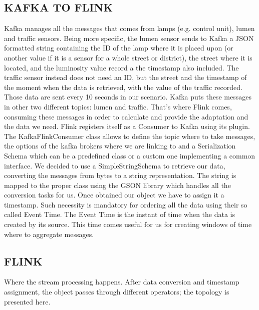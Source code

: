 \subsection{KAFKA TO FLINK}
Kafka manages all the messages that comes from lamps (e.g. control unit), lumen and traffic sensors. Being more specific, the lumen sensor sends to Kafka a JSON formatted string containing the ID of the lamp where it is placed upon (or another value if it is a sensor for a whole street or district), the street where it is located, and the luminosity value record a the timestamp also included. The traffic sensor instead does not need an ID, but the street and the timestamp of the moment when the data is retrieved, with the value of the traffic recorded. Those data are sent every 10 seconds in our scenario. Kafka puts these messages in other two different topics: lumen and traffic. That’s where Flink comes, consuming these messages in order to calculate and provide the adaptation and the data we need. Flink registers itself as a Consumer to Kafka using its plugin. The KafkaFlinkConsumer class allows to define the topic where to take messages, the options of the kafka brokers where we are linking to and a Serialization Schema which can be a predefined class or a custom one implementing a common interface. We decided to use a SimpleStringSchema to retrieve our data, converting the messages from bytes to a string representation. The string is mapped to the proper class using the GSON library which handles all the conversion tasks for us. Once obtained our object we have to assign it a timestamp. Such necessity is mandatory for ordering all the data using their so called Event Time. The Event Time is the instant of time when the data is created by its source. This time comes useful for us for creating windows of time where to aggregate messages.


\subsection{FLINK}
Where the stream processing happens. After data conversion and timestamp assignment, the object passes through different operators; the topology is presented here.


